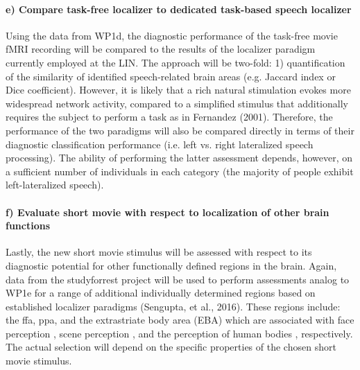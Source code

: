 \paragraph{e) Compare task-free localizer to dedicated task-based speech
localizer}
%
Using the data from WP1d, the diagnostic performance of the task-free movie fMRI
recording will be compared to the results of the localizer paradigm currently
employed at the LIN. The approach will be two-fold:
%
1) quantification of the similarity of identified speech-related brain areas
(e.g. Jaccard index or Dice coefficient).
%
However, it is likely that a rich natural stimulation evokes more widespread
network activity, compared to a simplified stimulus that additionally requires
the subject to perform a  task as in Fernandez (2001).
%
Therefore, the performance of the two paradigms will also be compared directly
in terms of their diagnostic classification performance (i.e. left vs. right
lateralized speech processing).
%
The ability of performing the latter assessment depends, however, on a
sufficient number of individuals in each category (the majority of people
exhibit left-lateralized speech).

\paragraph{f) Evaluate short movie with respect to localization of other brain
functions}
%
Lastly, the new short movie stimulus will be assessed with respect to its
diagnostic potential for other functionally defined regions in the brain.
%
Again, data from the studyforrest project will be used to perform assessments
analog to WP1e for a range of additional individually determined regions based
on established localizer paradigms (Sengupta, et al., 2016).
%
These regions include: the \ac{ffa}, \ac{ppa}, and the extrastriate body area
(EBA) which are associated with face perception \citep{kanwisher1997ffa,
pitcher2011occipitalfacearea}, scene perception \citep{epstein1998ppa}, and the
perception of human bodies \citep{downing2001bodyarea}, respectively.
%
The actual selection will depend on the specific properties of the chosen short
movie stimulus.


